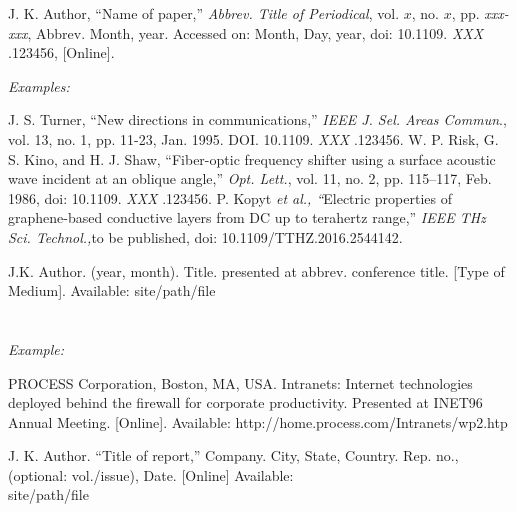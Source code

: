 \documentclass[journal,twoside,web]{ieeecolor}
\begin{document}

\noindent J. K. Author, ``Name of paper,'' {\it Abbrev. Title of Periodical}, vol. $x$, no. $x$, pp. {\it xxx-xxx}, Abbrev. Month, year.
Accessed on: Month, Day, year, doi:  {10.1109.} {{\it
XXX}} {.123456}, [Online].

{\it Examples:}{\vadjust{\vspace*{-2.5em}}}

\begin{thebibliography}{00}
 J. S. Turner, ``New directions in communications,'' {\it IEEE J. Sel. Areas Commun}., vol. 13, no. 1, pp. 11-23, Jan. 1995. DOI.  {10.1109.} {{\it XXX}} {.123456}.
 W. P. Risk, G. S. Kino, and H. J. Shaw, ``Fiber-optic frequency shifter using a surface acoustic wave incident at an oblique angle,'' {\it Opt. Lett.}, vol. 11, no. 2, pp. 115--117, Feb. 1986, doi: {10.1109.} {{\it XXX}} {.123456}.
 P. Kopyt {\it \textit{et al.}, ``}Electric properties of graphene-based conductive layers from DC up to terahertz range,'' {\it IEEE THz Sci. Technol.,}to be published, doi:  {10.1109/TTHZ.2016.2544142}.
\end{thebibliography}


\noindent J.K. Author. (year, month). Title. presented at abbrev. conference title.
[Type of Medium]. Available: site/path/file
\\
\\
\\
{\it Example:}{\vadjust{\vspace*{-2.5em}}}

\begin{thebibliography}{00}
 PROCESS Corporation, Boston, MA, USA. Intranets: Internet technologies deployed behind the firewall for corporate productivity. Presented at INET96 Annual Meeting. [Online]. Available:  {http://home.process.com/Intranets/wp2.htp}
\end{thebibliography}


\noindent J. K. Author. ``Title of report,'' Company. City, State, Country. Rep. no.,
(optional: vol./issue), Date. [Online] Available:\\
{site/path/file}\\
\end{document}
